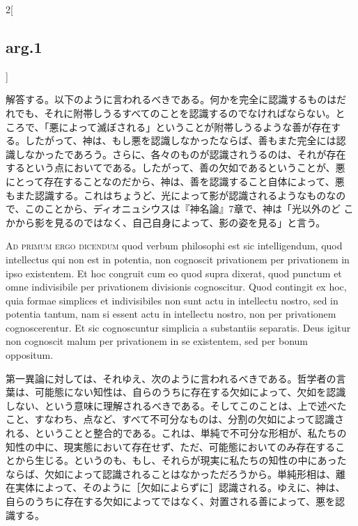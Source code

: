 \documentclass[paper=a4paper,fontsize=10pt,jafontsize=9pt,titlepage]{jlreq}
\begin{document}
\begin{paracol}{2}[\subsection{arg.1}]
\switchcolumn

解答する。以下のように言われるべきである。何かを完全に認識するものはだ
れでも、それに附帯しうるすべてのことを認識するのでなければならない。と
ころで、「悪によって滅ぼされる」ということが附帯しうるような善が存在す
る。したがって、神は、もし悪を認識しなかったならば、善もまた完全には認
識しなかったであろう。さらに、各々のものが認識されうるのは、それが存在
するという点においてである。したがって、善の欠如であるということが、悪
にとって存在することなのだから、神は、善を認識すること自体によって、悪
もまた認識する。これはちょうど、光によって影が認識されるようなものなの
で、このことから、ディオニュシウスは『神名論』7章で、神は「光以外のど
こかから影を見るのではなく、自己自身によって、影の姿を見る」と言う。

\switchcolumn*[\subsection{ad.1}]

{\scshape Ad primum ergo dicendum} quod verbum philosophi est sic
intelligendum, quod intellectus qui non est in potentia, non cognoscit
privationem per privationem in ipso existentem. Et hoc congruit cum eo
quod supra dixerat, quod punctum et omne indivisibile per privationem
divisionis cognoscitur. Quod contingit ex hoc, quia formae simplices
et indivisibiles non sunt actu in intellectu nostro, sed in potentia
tantum, nam si essent actu in intellectu nostro, non per privationem
cognoscerentur. Et sic cognoscuntur simplicia a substantiis
separatis. Deus igitur non cognoscit malum per privationem in se
existentem, sed per bonum oppositum.

\switchcolumn

第一異論に対しては、それゆえ、次のように言われるべきである。哲学者の言
葉は、可能態にない知性は、自らのうちに存在する欠如によって、欠如を認識
しない、という意味に理解されるべきである。そしてこのことは、上で述べた
こと、すなわち、点など、すべて不可分なものは、分割の欠如によって認識さ
れる、ということと整合的である。これは、単純で不可分な形相が、私たちの
知性の中に、現実態において存在せず、ただ、可能態においてのみ存在するこ
とから生じる。というのも、もし、それらが現実に私たちの知性の中にあった
ならば、欠如によって認識されることはなかっただろうから。単純形相は、離
在実体によって、そのように［欠如によらずに］認識される。ゆえに、神は、
自らのうちに存在する欠如によってではなく、対置される善によって、悪を認
識する。

\switchcolumn*[\subsection{ad.2}]


\end{paracol}
\end{document}
